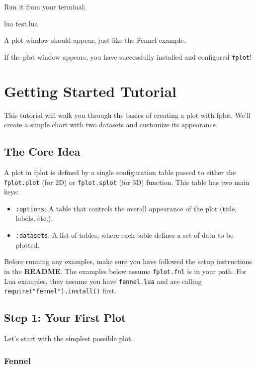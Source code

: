 \documentclass[12pt, letterpaper]{article}
\begin{document}
	Run it from your terminal:
	
	\begin{bashcode}
lua test.lua
	\end{bashcode}
	
	A plot window should appear, just like the Fennel example.
	
	If the plot window appears, you have successfully installed and configured \texttt{fplot}!
	
	\newpage
	
	\section{Getting Started Tutorial}
	
	This tutorial will walk you through the basics of creating a plot with fplot. We'll create a simple chart with two datasets and customize its appearance.
	
	\subsection{The Core Idea}
	
	A plot in fplot is defined by a single configuration table passed to either the \texttt{fplot.plot} (for 2D) or \texttt{fplot.splot} (for 3D) function. This table has two main keys:
	
	\begin{itemize}
		\item \texttt{:options}: A table that controls the overall appearance of the plot (title, labels, etc.).
		\item \texttt{:datasets}: A list of tables, where each table defines a set of data to be plotted.
	\end{itemize}
	
	Before running any examples, make sure you have followed the setup instructions in the \textbf{README}. The examples below assume \texttt{fplot.fnl} is in your path. For Lua examples, they assume you have \texttt{fennel.lua} and are calling \texttt{require("fennel").install()} first.
	
	\subsection{Step 1: Your First Plot}
	
	Let's start with the simplest possible plot.
	
	\subsubsection*{Fennel}
	
\end{document}
